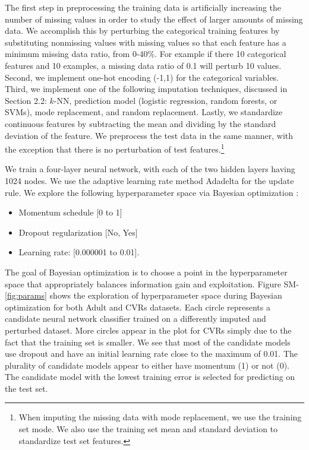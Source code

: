 \documentclass[10pt]{book}
\theoremstyle{definition}
\begin{document}
The first step in preprocessing the training data is artificially increasing the number of missing values in order to study the effect of larger amounts of missing data. We accomplish this by perturbing the categorical training features by substituting nonmissing values with missing values so that each feature has a minimum missing data ratio, from 0-40\%. For example if there 10 categorical features and 10 examples, a missing data ratio of 0.1 will perturb 10 values. Second, we implement one-hot encoding (-1,1) for the categorical variables. Third, we implement one of the following imputation techniques, discussed in Section 2.2: $k$-NN, prediction model (logistic regression, random forests, or SVMs), mode replacement, and random replacement. Lastly, we standardize continuous features by subtracting the mean and dividing by the standard deviation of the feature.  We preprocess the test data in the same manner, with the exception that there is no perturbation of test features.\footnote{When imputing the missing data with mode replacement, we use the training set mode. We also use the training set mean and standard deviation to standardize test set features.}

\par
{}


We train a four-layer neural network, with each of the two hidden layers having 1024 nodes. We use the adaptive learning rate method Adadelta \citep{zeiler2012} for the update rule. We explore the following hyperparameter space via Bayesian optimization \citep{snoek2012}:

\begin{itemize}
\item Momentum schedule [0 to 1]
\item Dropout regularization [No, Yes]
\item Learning rate: [0.000001 to 0.01].
\end{itemize}

The goal of Bayesian optimization is to choose a point in the hyperparameter space that appropriately balances information gain and exploitation. Figure SM-\ref{fig:params} shows the exploration of hyperparameter space during Bayesian optimization for both Adult and CVRs datasets. Each circle represents a candidate neural network classifier trained on a differently imputed and perturbed dataset. More circles appear in the plot for CVRs simply due to the fact that the training set is smaller. We see that most of the candidate models use dropout and have an initial learning rate close to the maximum of 0.01. The plurality of candidate models appear to either have momentum (1) or not (0). The candidate model with the lowest training error is selected for predicting on the test set. 
\end{document}

